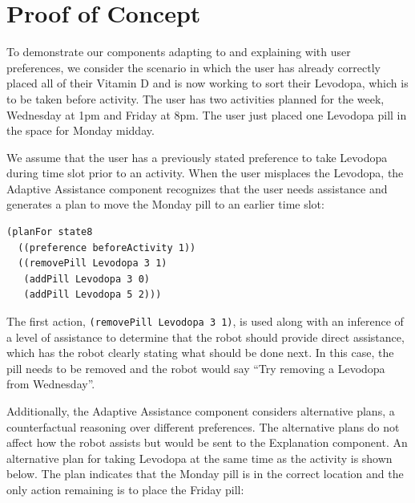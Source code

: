 \documentclass[letterpaper]{article} %
\begin{document}

\section{Proof of Concept}


To demonstrate our components adapting to and explaining with user preferences, we consider the scenario in which the user has already correctly placed all of their Vitamin D and is now working to sort their Levodopa, which is to be taken before activity.  The user has two activities planned for the week, Wednesday at 1pm and Friday at 8pm.  The user just placed one Levodopa pill in the space for Monday midday.  

We assume that the user has a previously stated preference to take Levodopa during time slot prior to an activity.  When the user misplaces the Levodopa, the Adaptive Assistance component recognizes that the user needs assistance and generates a plan to 
move the Monday pill to an earlier time slot:

\small{
\begin{verbatim}
(planFor state8 
  ((preference beforeActivity 1)) 
  ((removePill Levodopa 3 1)
   (addPill Levodopa 3 0) 
   (addPill Levodopa 5 2)))
\end{verbatim}}

The first action, \texttt{(removePill Levodopa 3 1)}, is used along with an inference of a level of assistance to determine that the robot should provide direct assistance, which has the robot clearly stating what should be done next.  In this case, the pill needs to be removed and the robot would say ``Try removing a Levodopa from Wednesday''.

Additionally, the Adaptive Assistance component considers alternative plans, a counterfactual reasoning over different preferences.  The alternative plans do not affect how the robot assists but would be sent to the Explanation component.  An alternative plan for taking Levodopa at the same time as the activity is shown below. 
The plan indicates that the Monday pill is in the correct location and the only action remaining is to place the Friday pill:
\end{document}
